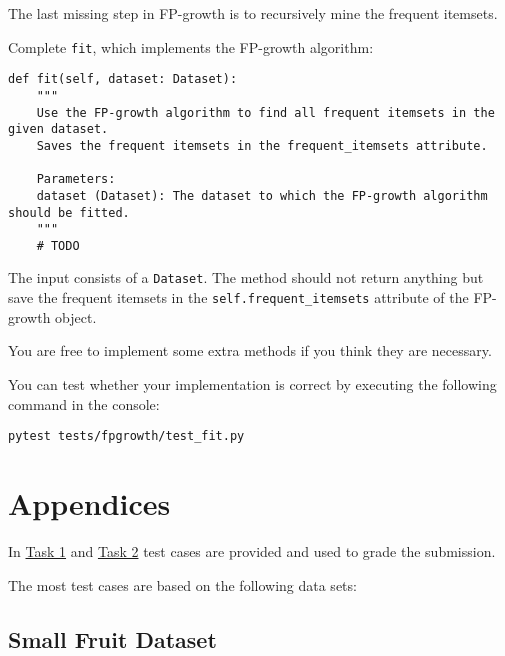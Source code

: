\documentclass[
english,
smallborders
]{i6prcsht}
\begin{document}
The last missing step in FP-growth is to recursively mine the frequent itemsets.

Complete \texttt{fit}, which implements the FP-growth algorithm:

\vspace*{0.3cm}

\begin{lstlisting}
def fit(self, dataset: Dataset):
	"""
	Use the FP-growth algorithm to find all frequent itemsets in the given dataset.
	Saves the frequent itemsets in the frequent_itemsets attribute.

	Parameters:
	dataset (Dataset): The dataset to which the FP-growth algorithm should be fitted.
	"""
	# TODO
\end{lstlisting}

\vspace*{0.1cm}

The input consists of a \texttt{Dataset}. The method should not return anything but save the frequent itemsets in the \texttt{self.frequent\_itemsets} attribute of the FP-growth object.

You are free to implement some extra methods if you think they are necessary.

You can test whether your implementation is correct by executing the following command in the console:

\vspace*{0.3cm}

\begin{lstlisting}
pytest tests/fpgrowth/test_fit.py
\end{lstlisting}











\newpage

\section*{Appendices}

In \hyperref[sec:task-one]{Task 1} and \hyperref[sec:task-one]{Task 2} test cases are provided and used to grade the submission.

The most test cases are based on the following data sets:

\subsection*{Small Fruit Dataset}
\end{document}
